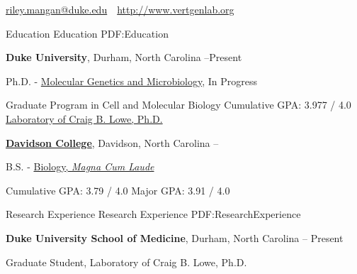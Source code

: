 \documentclass[letterpaper,MMMyyyy,nonstopmode]{simpleresumecv}
\newcommand{\CVAuthor}{Riley J. Mangan}
\newcommand{\CVWebpage}{http://www.vertgenlab.org}
\begin{document}

\Title{\CVAuthor}

\begin{SubTitle}
\href{mailto:riley.mangan@duke.edu}
{riley.mangan@duke.edu}
\,\SubBulletSymbol\,
\href{\CVWebpage}
{\url{\CVWebpage}}
\end{SubTitle}

\begin{Body}


\Section
{Education}
{Education}
{PDF:Education}

\Entry

{\textbf{Duke University}},
Durham, North Carolina \hfill
{} --Present

\Gap
\BulletItem
Ph.D. - 
\href{https://mgm.duke.edu/}
{Molecular Genetics and Microbiology}, In Progress

\begin{Detail}
\SubBulletItem
Graduate Program in Cell and Molecular Biology
\SubBulletItem
Cumulative GPA: 3.977 / 4.0
\SubBulletItem
\href{http://www.vertgenlab.org/}{Laboratory of Craig B. Lowe, Ph.D.}
\end{Detail}

\BigGap
\Entry
\href{https://www.davidson.edu/}
{\textbf{Davidson College}},
Davidson, North Carolina \hfill
{} --

\Gap
\BulletItem
B.S. -
\href{https://www.davidson.edu/academic-departments/biology}
{Biology, \textit{Magna Cum Laude}}

\begin{Detail}
\SubBulletItem
Cumulative GPA: 3.79 / 4.0
\SubBulletItem
Major GPA: 3.91 / 4.0
\end{Detail}




\Section
{Research Experience}
{Research Experience}
{PDF:ResearchExperience}


\Entry
\textbf{Duke University School of Medicine}, 
Durham, North Carolina \hfill
{} -- Present

\Gap
\BulletItem
Graduate Student, Laboratory of Craig B. Lowe, Ph.D. 


\end{Body}
\end{document}

